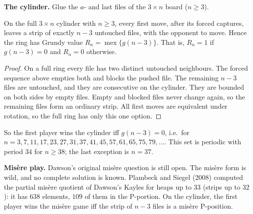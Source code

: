 \textbf{The cylinder.} Glue the $a$- and last files of the $3\times n$ board ($n\ge 3$).
\begin{lemma}
On the full $3\times n$ cylinder with $n\ge 3$, every first move, after its forced captures,
leaves a strip of exactly $n-3$ untouched files, with the opponent to move. Hence the ring
has Grundy value $R_n=\operatorname{mex}\{g(n-3)\}$. That is, $R_n=1$ if $g(n-3)=0$ and
$R_n=0$ otherwise.
\end{lemma}
\begin{proof}
On a full ring every file has two distinct untouched neighbours. The forced sequence above
empties both and blocks the pushed file. The remaining $n-3$ files are untouched, and they
are consecutive on the cylinder. They are bounded on both sides by empty files. Empty and
blocked files never change again, so the remaining files form an ordinary strip. All
first moves are equivalent under rotation, so the full ring has only this one option.
\end{proof}
So the first player wins the cylinder iff $g(n-3)=0$, i.e.\ for
$n=3,7,11,17,23,27,31,37,41,45,57,61,65,75,79,\dots$. This set is periodic with period
$34$ for $n\ge 38$; the last exception is $n=37$.

\textbf{Mis\`ere play.} Dawson's original mis\`ere question is still open. The
mis\`ere form is wild, and no complete solution is known. Plambeck and Siegel (2008)
computed the partial mis\`ere quotient of Dawson's Kayles for heaps up to $33$ (strips up to
$32$): it has $638$ elements, $109$ of them in the P-portion. On the cylinder, the first
player wins the mis\`ere game iff the strip of $n-3$ files is a mis\`ere P-position.
